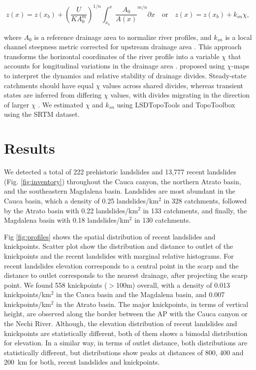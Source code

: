\documentclass[draft]{agujournal2019}
\begin{document}
\begin{linenomath*}
\begin{equation}
    z(x)= z(x_b)+\left(\frac{U}{KA_0^m}\right)^{1/n}\int_{x_b}^{x} \frac{A_0}{A(x)}^{m/n} \partial{x} \quad \text{or} \quad z(x)=z(x_b)+k_{sn}\chi,
\end{equation}
\end{linenomath*}

where $A_0$ is a reference drainage area to normalize river profiles, and $k_{sn}$ is a local channel steepness metric corrected for upstream drainage area \cite{whipple2017}. This approach transforms the horizontal coordinates of the river profile into a variable $\chi$ that accounts for longitudinal variations in the drainage area \cite{Mudd2014}.  proposed using $\chi$-maps to interpret the dynamics and relative stability of drainage divides. Steady-state catchments should have equal $\chi$ values across shared divides, whereas transient states are inferred from differing $\chi$ values, with divides migrating in the direction of larger $\chi$ \cite{Willett2014}. We estimated $\chi$ and $k_{sn}$ using LSDTopoTools \cite{Mudd2014} and TopoToolbox \cite{Schwanghart_2014} using the SRTM dataset.


\section{Results}

\par We detected a total of 222 prehistoric landslides and 13,777 recent landslides (Fig. \ref{fig:inventory}) throughout the Cauca canyon, the northern Atrato basin, and the southeastern Magdalena basin. Landslides are most abundant in the Cauca basin, which a density of 0.25 landslides/km$^2$ in 328 catchments, followed by the Atrato basin with 0.22 landslides/km$^2$ in 133 catchments, and finally, the Magdalena basin with 0.18 landslides/km$^2$ in 130 catchments.

\par Fig \ref{fig:profiles} shows the spatial distribution of recent landslides and knickpoints.  Scatter plot show the distribution and distance to outlet of the knickpoints and the recent landslides with marginal relative histograms. For recent landslides elevation corresponds to a central point in the scarp and the distance to outlet corresponds to the nearest drainage, after projecting the scarp point. We found 558 knickpoints ($>$100m) overall, with a density of 0.013 knickpoints/km$^2$ in the Cauca basin and the Magdalena basin, and 0.007 knickpoints/km$^2$ in the Atrato basin. The major knickpoints, in terms of vertical height, are observed along the border between the AP with the Cauca canyon or the Nechi River. Although, the elevation distribution of recent landslides and knickpoints are statistically different, both of them shows a bimodal distribution for elevation. In a similar way, in terms of outlet distance, both distributions are statistically different, but distributions show peaks at distances of 800, 400 and 200~km for both, recent landslides and knickpoints.
\end{document}
